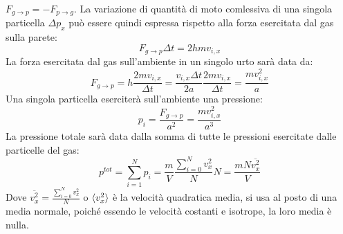 \documentclass{article}
\numberwithin{equation}{subsection}
\begin{document}
$F_{g\to p}=-F_{p\to g}$. 
La variazione di quantità di moto comlessiva di una singola particella $\Delta p_x$ può essere quindi espressa rispetto alla forza esercitata dal gas sulla parete: 
\begin{equation*}
    F_{g\to p}\Delta t=2hmv_{i,x}
\end{equation*}
La forza esercitata dal gas sull'ambiente in un singolo 
urto sarà data da:
\begin{equation*}
    F_{g\to p}=\displaystyle h\frac{2mv_{i,x}}{\Delta t}=\frac{v_{i,x}\Delta t}{2a}\frac{2mv_{i,x}}{\Delta t}=\frac{mv_{i,x}^2}{a}
\end{equation*} 
Una singola particella eserciterà sull'ambiente una pressione:
\begin{equation*}
    p_i=\displaystyle\frac{F_{g\to p}}{a^2}=\frac{mv_{i,x}^2}{a^3}
\end{equation*}
La pressione totale sarà data dalla somma di tutte le 
pressioni esercitate dalle particelle del gas:
\begin{equation*}
    p^{tot}=\sum_{i=1}^{N}p_i=\displaystyle\frac{m}{V}\frac{\sum_{i=0}^Nv_x^2}{N}N=\frac{mN\overline{v_x^2}}{V}
\end{equation*}
Dove $\overline{v_x^2}=\displaystyle\frac{\sum_{i=0}^Nv_x^2}{N}$ o $\braket{v_x^2}$ è la velocità quadratica 
media, si usa al posto di una media normale, poiché essendo le 
velocità costanti e isotrope, la loro media è nulla.
\end{document}
